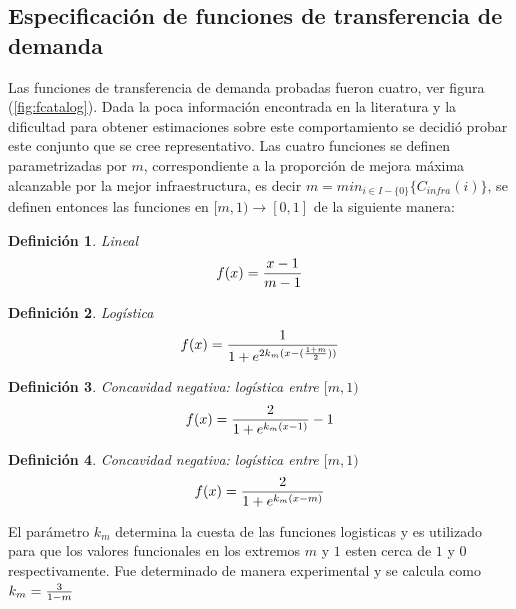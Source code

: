 \documentclass{article}
\newtheorem{definition}{Definición}
\begin{document}
  \subsection{Especificación de funciones de transferencia de demanda}

  Las funciones de transferencia de demanda probadas fueron cuatro, ver figura (\ref{fig:fcatalog}). Dada la poca información encontrada en la literatura y la dificultad para obtener estimaciones sobre este comportamiento se decidió probar este conjunto que se cree representativo. Las cuatro funciones se definen parametrizadas por $m$, correspondiente a la proporción de mejora máxima alcanzable por la mejor infraestructura, es decir $m = min_{i \in I - \{0\}} \{ C_{infra}(i) \}$, se definen entonces las funciones en $[m, 1) \rightarrow [0, 1]$ de la siguiente manera:

  \begin{definition}
    Lineal
    \begin{align}
        f(x) = {x -1 \over m - 1}
    \end{align}
  \end{definition}

  \begin{definition}
    Logística
    \begin{align}
        f(x) = {1 \over 1 + e^{2k_m(x - ({1 + m \over 2}))}}
    \end{align}
  \end{definition}

  \begin{definition}
    Concavidad negativa: logística entre $[m, 1)$
    \begin{align}
        f(x) = {2 \over 1 + e^{k_m(x - 1)}} - 1
    \end{align}
  \end{definition}

  \begin{definition}
    Concavidad negativa: logística entre $[m, 1)$
    \begin{align}
        f(x) = {2 \over 1 + e^{k_m(x - m)}}
    \end{align}
  \end{definition}

  El parámetro $k_m$ determina la cuesta de las funciones logisticas y es utilizado para que los valores funcionales en los extremos $m$ y $1$ esten cerca de $1$ y $0$ respectivamente. Fue determinado de manera experimental y se calcula como $k_m = {3 \over 1 - m}$
\end{document}
